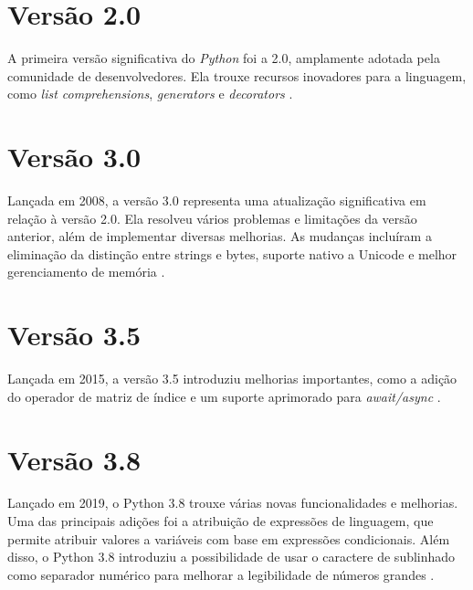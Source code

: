 \section{Versão 2.0}
A primeira versão significativa do \textit{Python} foi a 2.0, amplamente adotada pela comunidade de desenvolvedores. Ela trouxe recursos inovadores para a linguagem, como \textit{list comprehensions}, \textit{generators} e \textit{decorators} \cite{awari_python_version}.

\section{Versão 3.0}
Lançada em 2008, a versão 3.0 representa uma atualização significativa em relação à versão 2.0. Ela resolveu vários problemas e limitações da versão anterior, além de implementar diversas melhorias. As mudanças incluíram a eliminação da distinção entre strings e bytes, suporte nativo a Unicode e melhor gerenciamento de memória \cite{awari_python_version}.

\section{Versão 3.5}
Lançada em 2015, a versão 3.5 introduziu melhorias importantes, como a adição do operador de matriz de índice e um suporte aprimorado para \textit{await/async} \cite{awari_python_version}.

\section{Versão 3.8}
Lançado em 2019, o Python 3.8 trouxe várias novas funcionalidades e melhorias. Uma das principais adições foi a atribuição de expressões de linguagem, que permite atribuir valores a variáveis com base em expressões condicionais. Além disso, o Python 3.8 introduziu a possibilidade de usar o caractere de sublinhado como separador numérico para melhorar a legibilidade de números grandes \cite{awari_python_version}.